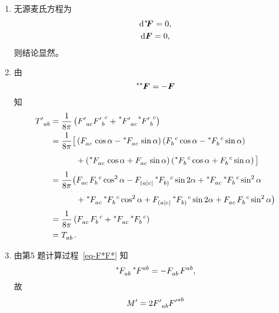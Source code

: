 \begin{xiti}
	\begin{zm}
		\begin{enumerate}[label = (\alph*)]
			\item 无源麦氏方程为
			\begin{gather*}
				\dd{\tensor[^*]{\!\form{F}}{}} = 0,\\
				\dd{\form{F}} = 0,
			\end{gather*}
			则结论显然。
			\item 由
			\begin{equation*}
				\tensor[^*^*]{\form{F}}{} = - \form{F}
			\end{equation*}
			知
			\begin{equation*}
				\begin{split}
					\tensor{{T'}}{_a_b} ={}& \frac{1}{8\pi} \left( \tensor{{F'}}{_a_c} \tensor{{F'}}{_b^c} + \tensor[^*]{{F'}}{_a_c} \tensor[^*]{{F'}}{_b^c} \right)\\
					={}& \frac{1}{8\pi} \big[ \left( \tensor{F}{_a_c} \cos \alpha - \tensor[^*]{F}{_a_c} \sin \alpha \right) \left( \tensor{F}{_b^c} \cos \alpha - \tensor[^*]{F}{_b^c} \sin \alpha \right)\\
					&\phantom{\frac{1}{8\pi} \big[} {}+ \left( \tensor[^*]{F}{_a_c} \cos \alpha + \tensor{F}{_a_c} \sin \alpha \right) \left( \tensor[^*]{F}{_b^c} \cos \alpha + \tensor{F}{_b^c} \sin \alpha \right) \big]\\
					={}& \frac{1}{8\pi} \big( \tensor{F}{_a_c} \tensor{F}{_b^c} \cos^2 \alpha - \tensor{F}{_{(a|c|}} \tensor[^*]{F}{_{b)}^c} \sin 2 \alpha + \tensor[^*]{F}{_a_c} \tensor[^*]{F}{_b^c} \sin^2 \alpha\\
					&\phantom{\frac{1}{8\pi} \big(} {}+ \tensor[^*]{F}{_a_c} \tensor[^*]{F}{_b^c} \cos^2 \alpha + \tensor{F}{_{(a|c|}} \tensor[^*]{F}{_{b)}^c} \sin 2 \alpha + \tensor{F}{_a_c} \tensor{F}{_b^c} \sin^2 \alpha \big)\\
					={}& \frac{1}{8\pi} \left( \tensor{F}{_a_c} \tensor{F}{_b^c} + \tensor[^*]{F}{_a_c} \tensor[^*]{F}{_b^c} \right)\\
					={}& \tensor[]{T}{_a_b}.
				\end{split}
			\end{equation*}
			\item 由第5 题计算过程~\eqref{eq-F*F*} 知
			\begin{equation}
					\tensor[^*]{F}{_a_b} \tensor[^*]{F}{^a^b} = - \tensor{F}{_a_b} \tensor{F}{^a^b},
			\end{equation}
			故
			\begin{align*}
					M' &= 2 \tensor[]{{F'}}{_a_b} \tensor[]{{F'}}{^a^b}\\

\end{align*}
\end{enumerate}
\end{zm}
\end{xiti}
